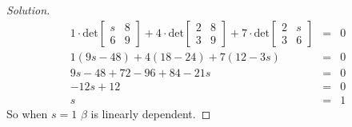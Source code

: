 \documentclass[12pt]{amsart}
\newenvironment{solution}
{\begin{proof}[Solution]}
{\end{proof}}
\begin{document}
\begin{onehalfspace}
\begin{solution}
\begin{eqnarray*}
                1\cdot\text{det}\left[\begin{matrix}
                                     s & 8\\
                                     6 & 9
                \end{matrix}\right] +
                4\cdot\text{det}\left[\begin{matrix}
                                     2 & 8\\
                                     3 & 9
                \end{matrix}\right] +
                7\cdot\text{det}\left[\begin{matrix}
                                     2 & s\\
                                     3 & 6
                \end{matrix}\right] & = & 0\\
                1(9s - 48) + 4(18 -24) + 7(12 - 3s) & = & 0 \\
                9s - 48 + 72 - 96 + 84 - 21s & = & 0 \\
                -12s + 12 & = & 0 \\
                s & = & 1
            \end{eqnarray*}
            So when $s = 1$ $\beta$ is linearly dependent.


\end{solution}
\end{onehalfspace}
\end{document}
